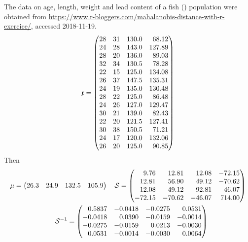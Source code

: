 \begin{refsection}
The data on age, length, weight and lead content of a fish () population were obtained from \href{https://www.r-bloggers.com/mahalanobis-distance-with-r-exercice/}{https://www.r-bloggers.com/mahalanobis-distance-with-r-exercice/}, accessed 2018-11-19.
\begin{gather} \AbsVec{x} =
  \begin{pmatrix*}[r]
     28 & 31 & 130.0 &  68.12 \\
     24 & 28 & 143.0 & 127.89 \\
     28 & 20 & 136.0 &  89.03 \\
     32 & 34 & 130.5 &  78.28 \\
     22 & 15 & 125.0 & 134.08 \\
     26 & 37 & 147.5 & 135.31 \\
     24 & 19 & 135.0 & 130.48 \\
     28 & 22 & 125.0 &  86.48 \\
     24 & 26 & 127.0 & 129.47 \\
     30 & 21 & 139.0 &  82.43 \\
     22 & 20 & 121.5 & 127.41 \\
     30 & 38 & 150.5 &  71.21 \\
     24 & 17 & 120.0 & 132.06 \\
     26 & 20 & 125.0 &  90.85
  \end{pmatrix*}
\end{gather}
Then
\begin{gather} \mu =
  \begin{pmatrix}
   26.3 & 24.9 & 132.5 & 105.9
  \end{pmatrix}
  \quad \arr{S} =
 \begin{pmatrix*}[r]
    9.76 &  12.81 &  12.08 & -72.15 \\
   12.81 &  56.90 &  49.12 & -70.62 \\
   12.08 &  49.12 &  92.81 & -46.07 \\
  -72.15 & -70.62 & -46.07 & 714.00
 \end{pmatrix*}
 \\ \quad \arr{S}^{-1} =
  \begin{pmatrix*}[r]
    0.5837 & -0.0418 & -0.0275 &  0.0531 \\
   -0.0418 &  0.0390 & -0.0159 & -0.0014 \\
   -0.0275 & -0.0159 &  0.0213 & -0.0030 \\
    0.0531 & -0.0014 & -0.0030 &  0.0064
  \end{pmatrix*}
\end{gather}

\end{refsection}
